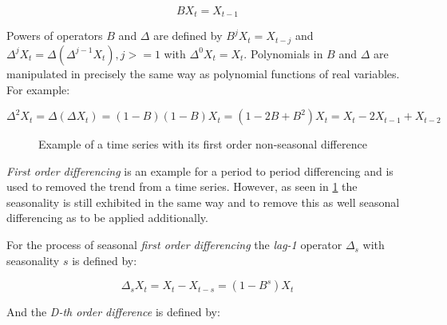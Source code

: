 \begin{equation}\label{eq:bachshift_operator}
B X_t = X_{t-1}
\end{equation}

Powers of operators \(B\) and \(\Delta\) are defined by \(B^j X_t = X_{t-j}\) and \(\Delta^j X_t = \Delta (\Delta^{j-1} X_t), j >= 1\) with \(\Delta^0 X_t = X_t\). Polynomials in \(B\) and \(\Delta\) are manipulated in precisely the same way as polynomial functions of real variables. For example:

\begin{equation}\label{eq:example_delta_squared}
\Delta^2 X_t = \Delta (\Delta X_t) = (1-B)(1-B)X_t = (1-2B + B^2) X_t = X_t - 2 X_{t-1} +  X_{t-2}
\end{equation}

\begin{figure}[ht]
	\centering
	\caption{Example of a time series with its first order non-seasonal difference}
	\label{fig:example_non_seasonal_diff}
\end{figure}

\textit{First order differencing} is an example for a period to period differencing and is used to removed the trend from a time series. However, as seen in \ref{fig:example_non_seasonal_diff} the seasonality is still exhibited in the same way and to remove this as well seasonal differencing as to be applied additionally.

For the process of seasonal \textit{first order differencing} the \textit{lag-1} operator \(\Delta_s\) with seasonality \(s\) is defined by:

\begin{equation}\label{eq:seasonal_first_difference}
\Delta_s X_t = X_t - X_{t-s} = (1-B^s)X_t
\end{equation}

And the \textit{D-th order difference} is defined by:

